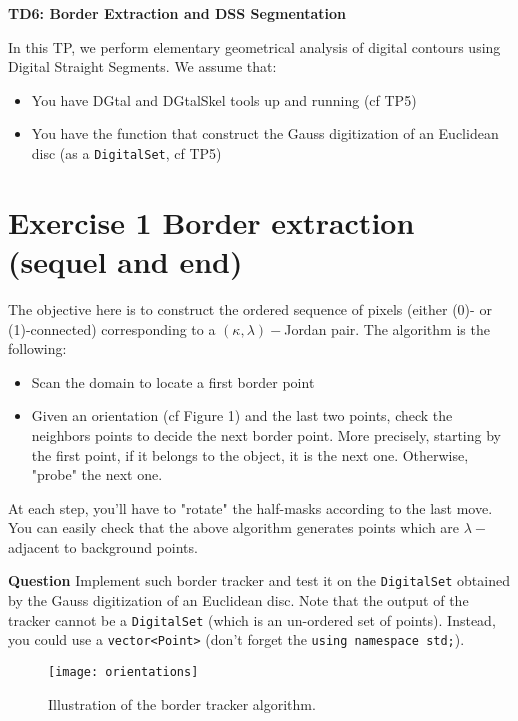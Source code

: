 \documentclass[a4paper, 11pt]{article}
\title{}
\author{}
\date{}
\begin{document}
\begin{center}
	\LARGE \textbf{TD6: Border Extraction and DSS Segmentation}
\end{center}

\bigskip
\par In this TP, we perform elementary geometrical analysis of digital contours using Digital Straight Segments. We assume that:
\begin{itemize}
	\item You have DGtal and DGtalSkel tools up and running (cf TP5)
	\item You have the function that construct the Gauss digitization of an Euclidean disc (as a \texttt{DigitalSet}, cf TP5)
\end{itemize}

\section*{Exercise 1 \rm Border extraction (sequel and end)}

\par The objective here is to construct the ordered sequence of pixels (either (0)- or (1)-connected) corresponding to a $(\kappa,\lambda)-$Jordan pair. The algorithm is the following:
\begin{itemize}
	\item Scan the domain to locate a first border point
	\item Given an orientation (cf Figure 1) and the last two points, check the neighbors points to decide the next border point. More precisely, starting by the first point, if it belongs to the object, it is the next one. Otherwise, "probe" the next one.
\end{itemize}

\par At each step, you'll have to "rotate" the half-masks according to the last move. You can easily check that the above algorithm generates points which are $\lambda-$adjacent to background points.

{\bf Question } Implement such border tracker and test it on the \texttt{DigitalSet} obtained by the Gauss digitization of an Euclidean disc. Note that the output of the tracker cannot be a \texttt{DigitalSet} (which is an un-ordered set of points). Instead, you could use a \texttt{vector<Point>} (don't forget the \texttt{using namespace std;}).

\begin{figure}[h]
\centering
\texttt{[image: orientations]}
\caption{Illustration of the border tracker algorithm.}
\end{figure}
\end{document}
